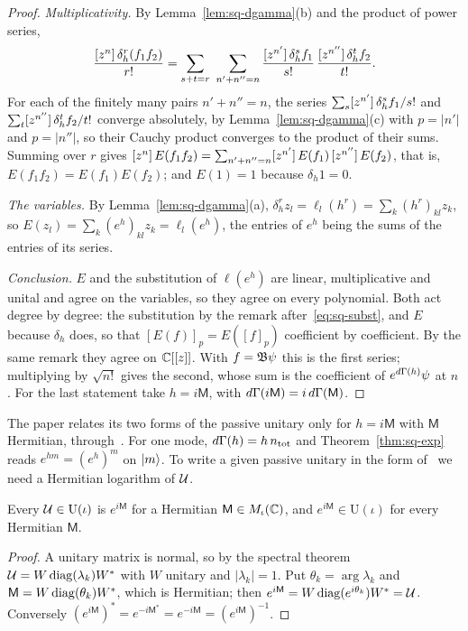 \begin{vetdenv}
\begin{proof}
\emph{Multiplicativity.} By Lemma~\ref{lem:sq-dgamma}(b) and the product of power series,
\[
 \frac{\coef n{\delta_h^r(f_1f_2)}}{r!}=\sum_{s+t=r}\ \sum_{n'+n''=n}\frac{\coef{n'}{\delta_h^sf_1}}{s!}\,
 \frac{\coef{n''}{\delta_h^tf_2}}{t!}.
\]
For each of the finitely many pairs $n'+n''=n$, the series $\sum_s[z^{n'}]\,\delta_h^sf_1/s!$ and
$\sum_t[z^{n''}]\,\delta_h^tf_2/t!$ converge absolutely, by Lemma~\ref{lem:sq-dgamma}(c) with $p=\lvert n'\rvert$ and
$p=\lvert n''\rvert$, so their Cauchy product converges to the product of their sums. Summing over $r$ gives
$[z^{n}]\,E(f_1f_2)=\sum_{n'+n''=n}[z^{n'}]\,E(f_1)\,[z^{n''}]\,E(f_2)$, that is, $E(f_1f_2)=E(f_1)E(f_2)$; and
$E(1)=1$ because $\delta_h1=0$.

\emph{The variables.} By Lemma~\ref{lem:sq-dgamma}(a), $\delta_h^rz_l=\ell_l(h^r)=\sum_k(h^r)_{kl}z_k$, so
$E(z_l)=\sum_k(e^h)_{kl}z_k=\ell_l(e^h)$, the entries of $e^h$ being the sums of the entries of its series.

\emph{Conclusion.} $E$ and the substitution of $\ell(e^h)$ are linear, multiplicative and unital and agree on the
variables, so they agree on every polynomial. Both act degree by degree: the substitution by the remark
after~\eqref{eq:sq-subst}, and $E$ because $\delta_h$ does, so that $[E(f)]_p=E([f]_p)$ coefficient by coefficient.
By the same remark they agree on $\mathbb C[[z]]$. With $f=\mathfrak B\psi$ this is the first series; multiplying by
$\sqrt{n!}$ gives the second, whose sum is the coefficient of $e^{d\Gamma(h)}\psi$ at $n$. For the last statement take
$h=i\mathsf M$, with $d\Gamma(i\mathsf M)=i\,d\Gamma(\mathsf M)$.
\end{proof}

The paper relates its two forms of the passive unitary only for $h=i\mathsf M$ with $\mathsf M$ Hermitian,
through~\cite[(A23)--(A26)]{tjoacirac}. For one mode, $d\Gamma(h)=h\,n_{\mathrm{tot}}$ and Theorem~\ref{thm:sq-exp} reads
$e^{hm}=(e^h)^m$ on $\lvert m\rangle$. To write a given passive unitary in the form of~\cite[(12)]{tjoacirac} we need a
Hermitian logarithm of $\mathcal U$.

\begin{lemma}\label{lem:sq-log}
Every $\mathcal U\in\mathrm U(\iota)$ is $e^{i\mathsf M}$ for a Hermitian $\mathsf M\in M_\iota(\mathbb C)$, and
$e^{i\mathsf M}\in\mathrm U(\iota)$ for every Hermitian $\mathsf M$.
\end{lemma}

\begin{proof}
A unitary matrix is normal, so by the spectral theorem $\mathcal U=W\operatorname{diag}(\lambda_k)W^*$ with $W$ unitary and
$\lvert\lambda_k\rvert=1$. Put $\theta_k=\arg\lambda_k$ and $\mathsf M=W\operatorname{diag}(\theta_k)W^*$, which is Hermitian; then
$e^{i\mathsf M}=W\operatorname{diag}(e^{i\theta_k})W^*=\mathcal U$. Conversely
$(e^{i\mathsf M})^*=e^{-i\mathsf M^*}=e^{-i\mathsf M}=(e^{i\mathsf M})^{-1}$.
\end{proof}


\end{vetdenv}
